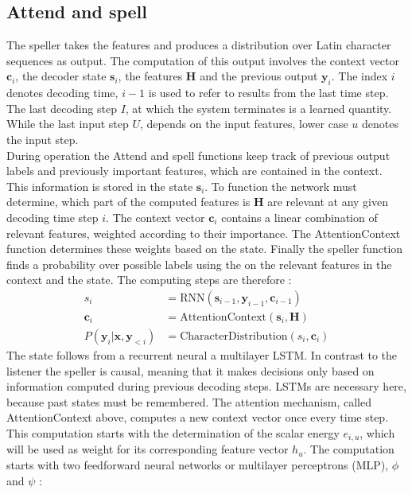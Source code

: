 \subsection{Attend and spell}
The speller takes the features and produces a distribution over Latin character sequences as output. The computation of this output involves the context vector $\mathbf{c}_i$, the decoder state $\mathbf{s}_i$, the features $\mathbf{H}$ and the previous output $\mathbf{y}_i$. The index $i$ denotes decoding time, $i-1$ is used to refer to results from the last time step. The last decoding step $I$, at which the system terminates is a learned quantity. While the last input step $U$, depends on the input features, lower case $u$ denotes the input step.\\
During operation the Attend and spell functions keep track of previous output labels and previously important features, which are contained in the context. This information is stored in the state $\mathbf{s}_i$. To function the network must determine, which part of the computed features is $\mathbf{H}$ are relevant at any given decoding time step $i$. The context vector $\mathbf{c}_i$ contains a linear combination of relevant features, weighted according to their importance. The AttentionContext function determines these weights based on the state. Finally the speller function finds a probability over possible labels using the on the relevant features in the context and the state. The computing steps are therefore \cite[page 4]{Chan2015}:
\begin{align}
 s_i &= \text{RNN}(\mathbf{s}_{i-1}, \mathbf{y}_{i-1}, \mathbf{c}_{i-1}) \\
 \mathbf{c}_i &= \text{AttentionContext}(\mathbf{s}_i,\mathbf{H}) \\
  P(\mathbf{y}_i|\mathbf{x}, \mathbf{y}_{<i}) &= \text{CharacterDistribution}(s_i,\textbf{c}_i)
\end{align}
The state follows from a recurrent neural a multilayer LSTM. In contrast to the listener the speller is causal, meaning that it makes decisions only based on information computed during previous decoding steps. LSTMs are necessary here, because past states must be remembered. The attention mechanism, called AttentionContext above, computes a new context vector once every time step.
This computation starts with the determination of the scalar energy $e_{i,u}$, which will be used as weight for its corresponding feature vector  $h_u$. The computation starts with two feedforward neural networks or multilayer perceptrons (MLP), $\phi$ and $\psi$ \cite[page 5]{Chan2015}:
